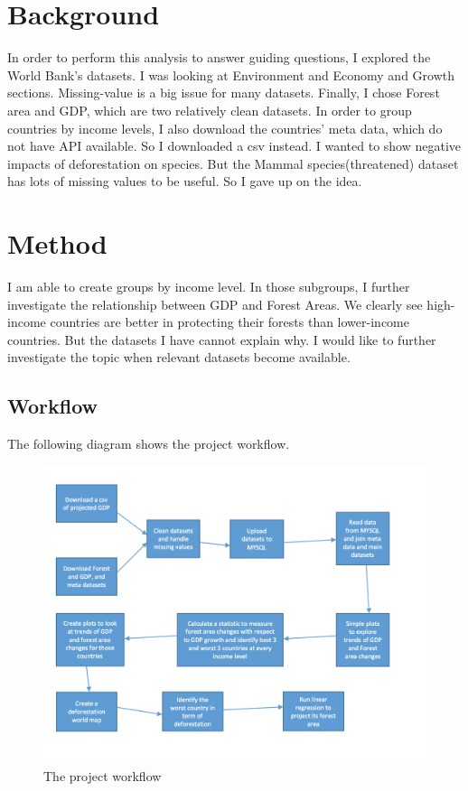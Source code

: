 \documentclass{article}
\begin{document}
\section{Background}

In order to perform this analysis to answer guiding questions, I explored the World Bank’s datasets.  I was looking at Environment and Economy and Growth sections. Missing-value is a big issue for many datasets.  Finally, I chose Forest area and GDP, which are two relatively clean datasets. In order to group countries by income levels, I also download the countries’ meta data, which do not have API available. So I downloaded a csv instead.  I wanted to show negative impacts of deforestation on species. But the Mammal species(threatened) dataset has lots of missing values to be useful. So I gave up on the idea. 
\pagebreak
\section{Method}
I am able to create groups by income level. In those subgroups, I further investigate the relationship between GDP and Forest Areas. We clearly see high-income countries are better in protecting their forests than lower-income countries. But the datasets I have cannot explain why. I would like to further investigate the topic when relevant datasets become available. 

\subsection{Workflow}
The following diagram shows the project workflow.
\begin{figure}[hb]
  \centering
    \includegraphics[scale=0.3]{workflow.png}
  \caption{The project workflow}
\end{figure}
\pagebreak
\end{document}
